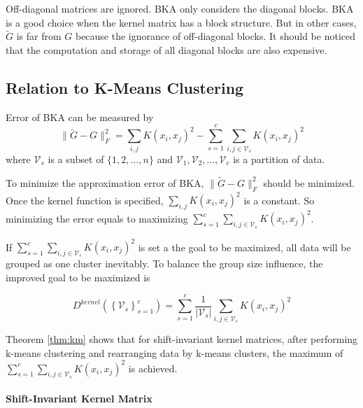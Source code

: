 \documentclass[12pt, a4paper, oneside]{article}
\begin{document}
Off-diagonal matrices are ignored. BKA only considers the diagonal blocks. BKA is a good choice when the kernel matrix has a block structure. But in other cases, $\tilde{G}$ is far from $G$ because the ignorance of off-diagonal blocks. It should be noticed that the computation and storage of all diagonal blocks are also expensive.

\subsection{Relation to K-Means Clustering}
\label{subsec:rkmc}

Error of BKA can be measured by 
\begin{equation}
	\|\tilde{G}-G\|_{F}^{2}=\sum_{i, j} K\left(x_{i}, x_{j}\right)^{2}-\sum_{s=1}^{c} \sum_{i, j \in \mathcal{V}_{s}} K\left(x_{i}, x_{j}\right)^{2}
\end{equation}
where $\mathcal{V}_{s}$ is a subset of $\{1,2,...,n\}$ and $\mathcal{V}_{1}, \mathcal{V}_{2},...,\mathcal{V}_{c}$ is a partition of data.

To minimize the approximation error of BKA, $\|\tilde{G}-G\|_{F}^{2}$ should be minimized. Once the kernel function is specified, $\sum_{i, j} K\left(x_{i}, x_{j}\right)^{2}$ is a constant. So minimizing the error equals to maximizing $\sum_{s=1}^{c} \sum_{i, j \in \mathcal{V}_{s}} K\left(x_{i}, x_{j}\right)^{2}$. 

If $\sum_{s=1}^{c} \sum_{i, j \in \mathcal{V}_{s}} K\left(x_{i}, x_{j}\right)^{2}$ is set a the goal to be maximized, all data will be grouped as one cluster inevitably. To balance the group size influence, the improved goal to be maximized is

\begin{equation}
	D^{k e r n e l}\left(\left\{\mathcal{V}_{s}\right\}_{s=1}^{c}\right) = 
	\sum_{s=1}^{c} \frac{1}{|\mathcal{V}_{s}|} \sum_{i, j \in \mathcal{V}_{s}} K\left(x_{i}, x_{j}\right)^{2}
\end{equation}


Theorem \ref{thm:km} shows that for shift-invariant kernel matrices, after performing k-means clustering and rearranging data by k-means clusters, the maximum of $\sum_{s=1}^{c} \sum_{i, j \in \mathcal{V}_{s}} K\left(x_{i}, x_{j}\right)^{2}$ is achieved.

\paragraph{Shift-Invariant Kernel Matrix}
\end{document}
